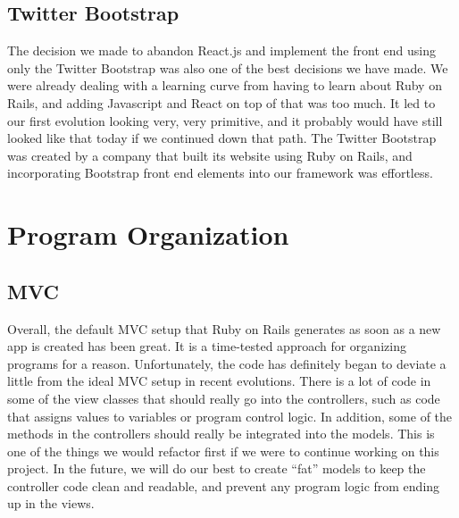 \documentclass{article}
\begin{document}
\subsection{Twitter Bootstrap}
The decision we made to abandon React.js and implement the front end using only the Twitter Bootstrap was also one of the best decisions we have made.  We were already dealing with a learning curve from having to learn about Ruby on Rails, and adding Javascript and React on top of that was too much.  It led to our first evolution looking very, very primitive, and it probably would have still looked like that today if we continued down that path.  The Twitter Bootstrap was created by a company that built its website using Ruby on Rails, and incorporating Bootstrap front end elements into our framework was effortless.  
\section{Program Organization}
\subsection{MVC}
Overall, the default MVC setup that Ruby on Rails generates as soon as a new app is created has been great.  It is a time-tested approach for organizing programs for a reason.  Unfortunately, the code has definitely began to deviate a little from the ideal MVC setup in recent evolutions.  There is a lot of code in some of the view classes that should really go into the controllers, such as code that assigns values to variables or program control logic.  In addition, some of the methods in the controllers should really be integrated into the models.  This is one of the things we would refactor first if we were to continue working on this project.  In the future, we will do our best to create ``fat'' models to keep the controller code clean and readable, and prevent any program logic from ending up in the views.
\end{document}
